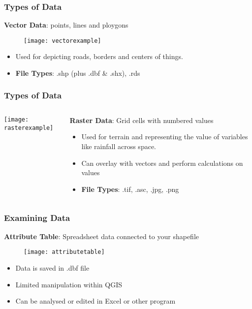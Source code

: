 \documentclass{beamer}
\begin{document}
\begin{frame}
\frametitle{Types of Data}
\textbf{Vector Data}: points, lines and ploygons
 \begin{figure}[h]
  \centering
  \texttt{[image: vectorexample]}
 \end{figure}
 
 \begin{itemize}
 \item Used for depicting roads, borders and centers of things.
 \item \textbf{File Types}: .shp (plus .dbf & .shx), .rds
 \end{itemize}
\end{frame}

\begin{frame}
\frametitle{Types of Data}
\begin{columns}
 \begin{column}[T]{.6\textwidth}
   \texttt{[image: rasterexample]}
 \end{column}  
 \begin{column}[T]{0.4\textwidth}
  \textbf{Raster Data}: Grid cells with numbered values
  \begin{itemize}
  \item Used for terrain and representing the value of variables like rainfall across space.
  \item Can overlay with vectors and perform calculations on values
  \item \textbf{File Types}: .tif, .asc, .jpg, .png 
  \end{itemize}
 \end{column}
\end{columns}
\end{frame}

\begin{frame}
\frametitle{Examining Data}
 \textbf{Attribute Table}: Spreadsheet data connected to your shapefile
 \begin{figure}[h]
  \texttt{[image: attributetable]}
 \end{figure}
 
  \begin{itemize}
  \item Data is saved in .dbf file
  \item Limited manipulation within QGIS
  \item Can be analysed or edited in Excel or other program
  \end{itemize}

\end{frame}
\end{document}
